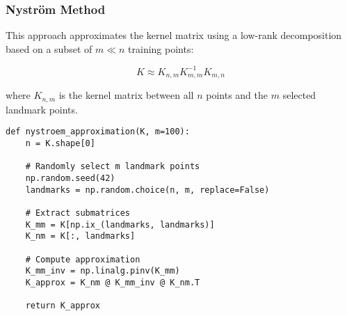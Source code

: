 \documentclass[11pt]{article}
\begin{document}
\subsubsection{Nyström Method}
This approach approximates the kernel matrix using a low-rank decomposition based on a subset of $m \ll n$ training points:

\[
K \approx K_{n,m} K_{m,m}^{-1} K_{m,n}
\]

where $K_{n,m}$ is the kernel matrix between all $n$ points and the $m$ selected landmark points.

\begin{lstlisting}
def nystroem_approximation(K, m=100):
    n = K.shape[0]
    
    # Randomly select m landmark points
    np.random.seed(42)
    landmarks = np.random.choice(n, m, replace=False)
    
    # Extract submatrices
    K_mm = K[np.ix_(landmarks, landmarks)]
    K_nm = K[:, landmarks]
    
    # Compute approximation
    K_mm_inv = np.linalg.pinv(K_mm)
    K_approx = K_nm @ K_mm_inv @ K_nm.T
    
    return K_approx
\end{lstlisting}
\end{document}
